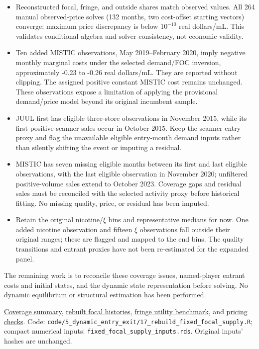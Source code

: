 \documentclass[10pt,]{article}
\providecommand{\tightlist}{%
  \setlength{\itemsep}{0pt}\setlength{\parskip}{0pt}}
\begin{document}
\begin{itemize}
\tightlist
\item
  Reconstructed focal, fringe, and outside shares match observed values.
  All 264 manual observed-price solves (132 months, two cost-offset
  starting vectors) converge; maximum price discrepancy is below
  \(10^{-10}\) real dollars/mL. This validates conditional algebra and
  solver consistency, not economic validity.
\item
  Ten added MISTIC observations, May 2019--February 2020, imply negative
  monthly marginal costs under the selected demand/FOC inversion,
  approximately -0.23 to -0.26 real dollars/mL. They are reported
  without clipping. The assigned positive constant MISTIC cost remains
  unchanged. These observations expose a limitation of applying the
  provisional demand/price model beyond its original incumbent sample.
\item
  JUUL first has eligible three-store observations in November 2015,
  while its first positive scanner sales occur in October 2015. Keep the
  scanner entry proxy and flag the unavailable eligible entry-month
  demand inputs rather than silently shifting the event or imputing a
  residual.
\item
  MISTIC has seven missing eligible months between its first and last
  eligible observations, with the last eligible observation in November
  2020; unfiltered positive-volume sales extend to October 2023.
  Coverage gaps and residual sales must be reconciled with the selected
  activity proxy before historical fitting. No missing quality, price,
  or residual has been imputed.
\item
  Retain the original nicotine/\(\xi\) bins and representative medians
  for now. One added nicotine observation and fifteen \(\xi\)
  observations fall outside their original ranges; these are flagged and
  mapped to the end bins. The quality transitions and entrant proxies
  have not been re-estimated for the expanded panel.
\end{itemize}

The remaining work is to reconcile these coverage issues, named-player
entrant costs and initial states, and the dynamic state representation
before solving. No dynamic equilibrium or structural estimation has been
performed.

\href{../../output/dynamic_entry_exit/fixed_focal_supply_2026-11-05/brand_coverage_summary.csv}{Coverage
summary},
\href{../../output/dynamic_entry_exit/fixed_focal_supply_2026-11-05/focal_observed_recovery.csv}{rebuilt
focal histories},
\href{../../output/dynamic_entry_exit/fixed_focal_supply_2026-11-05/constant_fringe_utility.csv}{fringe
utility benchmark}, and
\href{../../output/dynamic_entry_exit/fixed_focal_supply_2026-11-05/pricing_validation.csv}{pricing
checks}. Code:
\texttt{code/5\_dynamic\_entry\_exit/17\_rebuild\_fixed\_focal\_supply.R};
compact numerical inputs: \texttt{fixed\_focal\_supply\_inputs.rds}.
Original inputs' hashes are unchanged.
\end{document}
